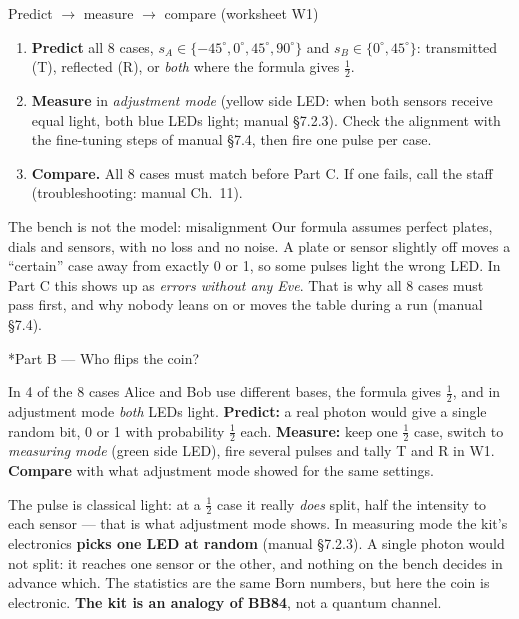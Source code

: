 \documentclass[a4paper,11pt]{article}
\makeatletter
\renewcommand\section{\@startsection{section}{1}{\z@}{-1.6ex \@plus -.5ex}{0.6ex}{\normalfont\large\bfseries\color{ibmblue}}}
\newenvironment{steps}{\begin{enumerate}\setlength{\itemsep}{1pt}\setlength{\parsep}{0pt}\setlength{\topsep}{2pt}}{\end{enumerate}}
\makeatother
\begin{document}
\begin{pmcbox}{Predict $\rightarrow$ measure $\rightarrow$ compare (worksheet W1)}
\begin{steps}
  \item \textbf{Predict} all 8 cases, $s_A \in \{-45^\circ, 0^\circ, 45^\circ, 90^\circ\}$
        and $s_B \in \{0^\circ, 45^\circ\}$: transmitted (T), reflected (R), or
        \emph{both} where the formula gives $\tfrac12$.
  \item \textbf{Measure} in \emph{adjustment mode} (yellow side LED: when both sensors
        receive equal light, both blue LEDs light; manual \S7.2.3). Check the alignment
        with the fine-tuning steps of manual \S7.4, then fire one pulse per case.
  \item \textbf{Compare.} All 8 cases must match before Part C. If one fails, call the
        staff (troubleshooting: manual Ch.~11).
\end{steps}
\end{pmcbox}

\begin{devbox}{The bench is not the model: misalignment}
Our formula assumes perfect plates, dials and sensors, with no loss and no noise. A
plate or sensor slightly off moves a ``certain'' case away from exactly 0 or 1, so some
pulses light the wrong LED. In Part C this shows up as \emph{errors without any Eve}.
That is why all 8 cases must pass first, and why nobody leans on or moves the table
during a run (manual \S7.4).
\end{devbox}

\section*{Part B --- Who flips the coin?}

In 4 of the 8 cases Alice and Bob use different bases, the formula gives $\tfrac12$, and
in adjustment mode \emph{both} LEDs light. \textbf{Predict:} a real photon would give a
single random bit, 0 or 1 with probability $\tfrac12$ each. \textbf{Measure:} keep one
$\tfrac12$ case, switch to \emph{measuring mode} (green side LED), fire several pulses
and tally T and R in W1. \textbf{Compare} with what adjustment mode showed for the same
settings.

\begin{shockbox}
The pulse is classical light: at a $\tfrac12$ case it really \emph{does} split, half the
intensity to each sensor --- that is what adjustment mode shows. In measuring mode the
kit's electronics \textbf{picks one LED at random} (manual \S7.2.3). A single photon
would not split: it reaches one sensor or the other, and nothing on the bench decides in
advance which. The statistics are the same Born numbers, but here the coin is
electronic. \textbf{The kit is an analogy of BB84}, not a quantum channel.
\end{shockbox}
\end{document}
